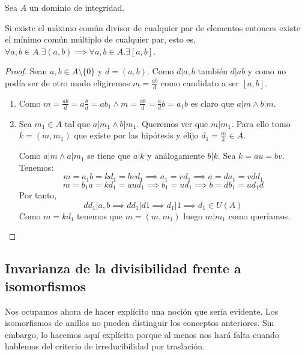 \begin{proposition}
Sea $A$ un dominio de integridad. 

Si existe el máximo común divisor de cualquier par de elementos entonces existe el mínimo común múltiplo de cualquier par, esto es, $\forall a,b \in A. \exists (a,b) \implies \forall a,b \in A. \exists [a,b]$.
\end{proposition}
\begin{proof}
Sean $a,b \in A \setminus \{0\}$ y $d = (a,b)$. Como $d|a,b$ también $d|ab$ y como no podía ser de otro modo eligiremos $m = \frac{ab}{d}$ como candidato a ser $[a,b]$.

\begin{enumerate}
\item Como $m = \frac{ab}{d} = a \frac{b}{d} = ab_1 \land  m = \frac{ab}{d}= \frac{a}{d}b = a_1b$ es claro que $a|m \land b|m$. 
\item Sea $m_1 \in A$ tal que $a|m_1 \land b|m_1$. Queremos ver que $m|m_1$. Para ello tomo $k = (m,m_1)$ que existe por las hipótesis y elijo $d_1 = \frac{m}{k} \in A$. 

Como $a|m \land a|m_1$ se tiene que $a|k$ y análogamente $b|k$. Sea $k = au = bv$. Tenemos: $$m = a_1b = kd_1 = bvd_1\implies a_1 = vd_1 \implies a = da_1 = vdd_1$$ $$m = b_1a = k d_1 = aud_1 \implies b_1 = ud_1 \implies b = db_1 = ud_1d$$ Por tanto, $$dd_1|a,b \implies dd_1 |d1 \implies d_1|1 \implies d_1 \in U(A)$$ Como $m = kd_1$ tenemos que $m = (m,m_1)$ luego $m|m_1$ como queríamos. 
\end{enumerate}

\end{proof}

\subsection{Invarianza de la divisibilidad frente a isomorfismos}

Nos ocupamos ahora de hacer explícito una noción que sería evidente. Los isomorfismos de anillos no pueden distinguir los conceptos anteriores. Sin embargo, lo hacemos aquí explícito porque al menos nos hará falta cuando hablemos del criterio de irreducibilidad por traslación. 

